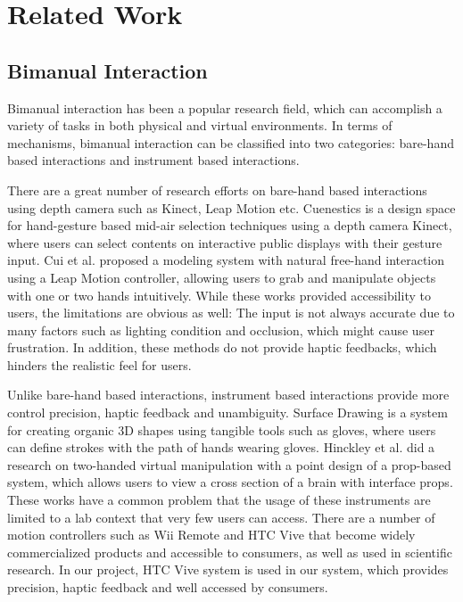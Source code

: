 
\section{Related Work}
\label{sec:2}

\subsection{Bimanual Interaction}
\label{sec:2.1}
Bimanual interaction has been a popular research field, which can accomplish a variety of tasks in both physical and virtual environments.
In terms of mechanisms, bimanual interaction can be classified into two categories: bare-hand based interactions and instrument based interactions.

There are a great number of research efforts \cite{walter2014cuenesics,cui2016exploration,ramani2015gesture,murugappan2013handy,han2014virtual} on bare-hand based interactions using depth camera such as Kinect, Leap Motion etc.
Cuenestics \cite{walter2014cuenesics} is a design space for hand-gesture based mid-air selection techniques using a depth camera Kinect, where users can select contents on interactive public displays with their gesture input.
Cui et al. \cite{cui2016exploration} proposed a modeling system with natural free-hand interaction using a Leap Motion controller, allowing users to grab and manipulate objects with one or two hands intuitively.
While these works provided accessibility to users, the limitations are obvious as well: The input is not always accurate due to many factors such as lighting condition and occlusion, which might cause user frustration.
In addition, these methods do not provide haptic feedbacks, which hinders the realistic feel for users.

Unlike bare-hand based interactions, instrument based interactions provide more control precision, haptic feedback and unambiguity.
Surface Drawing \cite{schkolne2001surface} is a system for creating organic 3D shapes using tangible tools such as gloves, where users can define strokes with the path of hands wearing gloves.
Hinckley et al. \cite{hinckley1998two} did a research on two-handed virtual manipulation with a point design of a prop-based system, which allows users to view a cross section of a brain with interface props.
These works have a common problem that the usage of these instruments are limited to a lab context that very few users can access.
There are a number of motion controllers such as Wii Remote \cite{wingcrave2010wii} and HTC Vive \cite{niehorster2017accuracy} that become widely commercialized products and accessible to consumers, as well as used in scientific research.
In our project, HTC Vive system is used in our system, which provides precision, haptic feedback and well accessed by consumers.

